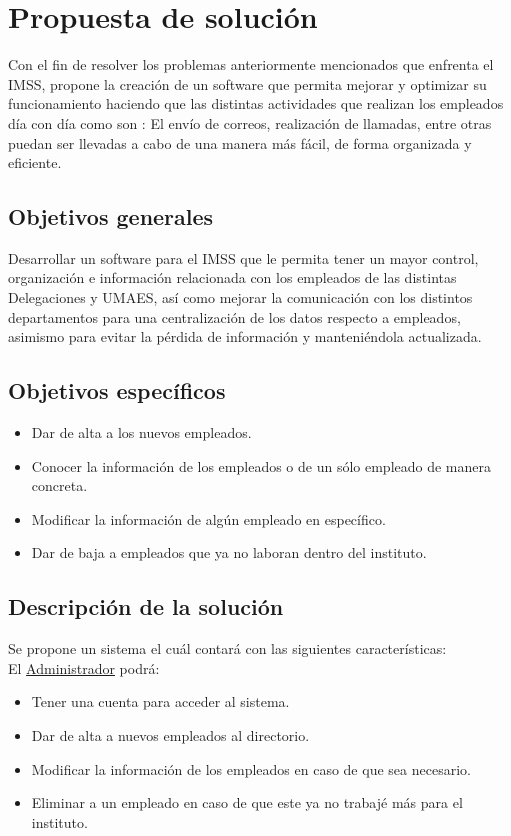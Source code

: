 \section{Propuesta de solución}
Con el fin de resolver los problemas anteriormente mencionados que enfrenta el IMSS, propone la creación de un software que permita mejorar y optimizar su funcionamiento haciendo que las distintas actividades que realizan los empleados día con día como son : El envío de correos, realización de llamadas, entre otras puedan ser llevadas a cabo de una manera más fácil, de forma organizada y eficiente.

\subsection{Objetivos generales}
Desarrollar un software para el IMSS que le permita tener un mayor control, organización e información relacionada con los empleados de las distintas Delegaciones y UMAES, así como mejorar la comunicación con los distintos departamentos para una centralización de los datos respecto a empleados, asimismo para evitar la pérdida de información y manteniéndola actualizada.

\subsection{Objetivos específicos}

\begin{itemize}
    \item Dar de alta a los nuevos empleados.
    \item Conocer la información de los empleados o de un sólo empleado de manera concreta.
    \item Modificar la información de algún empleado en específico.
    \item Dar de baja a empleados que ya no laboran dentro del instituto.
\end{itemize}

\subsection{Descripción de la solución}
Se propone un sistema el cuál contará con las siguientes características:\\
El \hyperlink{UsrDef:Administrador}{Administrador} podrá:
\begin{itemize}
	\item Tener una cuenta para acceder al sistema. 
	\item Dar de alta a nuevos empleados al directorio.
	\item Modificar la información de los empleados en caso de que sea necesario.
	\item Eliminar a un empleado en caso de que este ya no trabajé más para el instituto.
	\\
\end{itemize}

